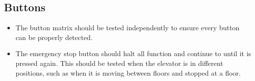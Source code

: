 \documentclass{article}
\begin{document}
	    \subsection{Buttons}
	    \begin{itemize}
	        \item The button matrix should be tested independently to ensure every button can be properly detected.
	        \item The emergency stop button should halt all function and continue to until it is pressed again. This should be tested when the elevator is in different positions, such as when it is moving between floors and stopped at a floor.
	    \end{itemize}
	    
	    \newpage
	    \nocite{*}
        
        
\end{document}
